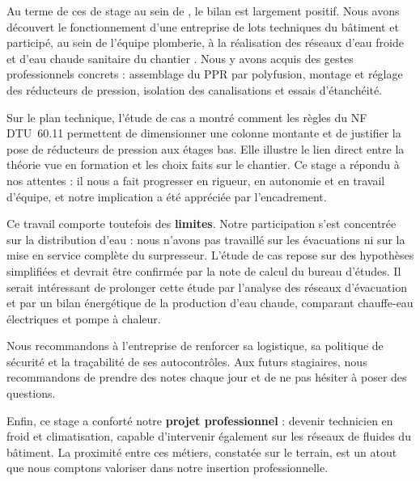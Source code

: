 
Au terme de ces \InfoDuree{} de stage au sein de \InfoEntreprise, le bilan est largement
positif. Nous avons découvert le fonctionnement d'une entreprise de lots techniques du bâtiment
et participé, au sein de l'équipe plomberie, à la réalisation des réseaux d'eau froide et
d'eau chaude sanitaire du chantier \InfoChantier. Nous y avons acquis des gestes
professionnels concrets : assemblage du PPR par polyfusion, montage et réglage des
réducteurs de pression, isolation des canalisations et essais d'étanchéité.

Sur le plan technique, l'étude de cas a montré comment les règles du NF DTU~60.11 permettent
de dimensionner une colonne montante et de justifier la pose de réducteurs de pression aux
étages bas. Elle illustre le lien direct entre la théorie vue en formation et les choix faits
sur le chantier. Ce stage a répondu à nos attentes : il nous a fait progresser en rigueur, en
autonomie et en travail d'équipe, et notre implication a été appréciée par l'encadrement.

Ce travail comporte toutefois des \textbf{limites}. Notre participation s'est concentrée sur la
distribution d'eau : nous n'avons pas travaillé sur les évacuations ni sur la mise en service
complète du surpresseur. L'étude de cas repose sur des hypothèses simplifiées et devrait être
confirmée par la note de calcul du bureau d'études. Il serait intéressant de prolonger cette
étude par l'analyse des réseaux d'évacuation et par un bilan énergétique de la production
d'eau chaude, comparant chauffe-eau électriques et pompe à chaleur.

Nous recommandons à l'entreprise de renforcer sa logistique, sa politique de sécurité et la
traçabilité de ses autocontrôles. Aux futurs stagiaires, nous recommandons de prendre des notes
chaque jour et de ne pas hésiter à poser des questions.

Enfin, ce stage a conforté notre \textbf{projet professionnel} : devenir technicien en froid et
climatisation, capable d'intervenir également sur les réseaux de fluides du bâtiment. La
proximité entre ces métiers, constatée sur le terrain, est un atout que nous comptons valoriser
dans notre insertion professionnelle.
